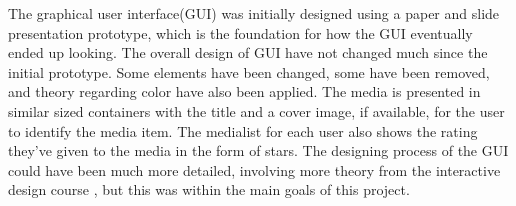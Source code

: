 The graphical user interface(GUI) was initially designed using a paper and slide presentation prototype, which is the foundation for how the GUI eventually ended up looking. The overall design of GUI have not changed much since the initial prototype. Some elements have been changed, some have been removed, and theory regarding color have also been applied. The media is presented in similar sized containers with the title and a cover image, if available, for the user to identify the media item. The medialist for each user also shows the rating they’ve given to the media in the form of stars. The designing process of the GUI could have been much more detailed, involving more theory from the interactive design course \cite{DEBBook}, but this was within the main goals of this project.